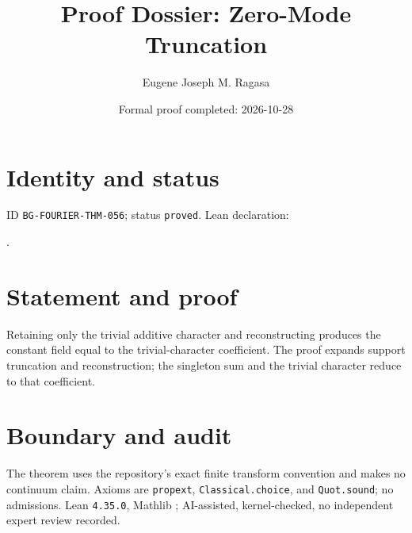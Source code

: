 \documentclass[11pt]{article}
\title{Proof Dossier: Zero-Mode Truncation}\author{Eugene Joseph M. Ragasa}\date{Formal proof completed: 2026-10-28}
\begin{document}
\raggedright\maketitle
\section{Identity and status}
ID \texttt{BG-FOURIER-THM-056}; status \texttt{proved}. Lean declaration:
\par{}.
\section{Statement and proof}
Retaining only the trivial additive character and reconstructing produces the constant field equal to the trivial-character coefficient. The proof expands support truncation and reconstruction; the singleton sum and the trivial character reduce to that coefficient.
\section{Boundary and audit}
The theorem uses the repository's exact finite transform convention and makes no continuum claim. Axioms are \texttt{propext}, \texttt{Classical.choice}, and \texttt{Quot.sound}; no admissions. Lean \texttt{4.35.0}, Mathlib {\scriptsize{}}; AI-assisted, kernel-checked, no independent expert review recorded.
\end{document}
